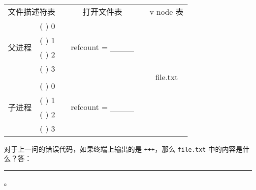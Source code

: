 \begin{problems}
\begin{table}[H]
            \tt
            \centering
            \begin{tabular}{cccccc}
                \multicolumn{2}{c}{文件描述符表} & {\qquad} & 打开文件表 & {\qquad} & v-node 表 \\ \cline{1-2} \cline{4-4} \cline{6-6} 
                \multicolumn{1}{|c|}{\multirow{4}{*}{父进程}} & \multicolumn{1}{c|}{(     ) 0} & \multicolumn{1}{c|}{} & \multicolumn{1}{c|}{\multirow{4}{*}{refcount = \_\_\_\_}} & \multicolumn{1}{c|}{} & \multicolumn{1}{c|}{\multirow{9}{*}{file.txt}} \\ \cline{2-2}
                \multicolumn{1}{|c|}{} & \multicolumn{1}{c|}{(     ) 1} & \multicolumn{1}{c|}{} & \multicolumn{1}{c|}{} & \multicolumn{1}{c|}{} & \multicolumn{1}{c|}{} \\ \cline{2-2}
                \multicolumn{1}{|c|}{} & \multicolumn{1}{c|}{(     ) 2} & \multicolumn{1}{c|}{} & \multicolumn{1}{c|}{} & \multicolumn{1}{c|}{} & \multicolumn{1}{c|}{} \\ \cline{2-2}
                \multicolumn{1}{|c|}{} & \multicolumn{1}{c|}{(     ) 3} & \multicolumn{1}{c|}{} & \multicolumn{1}{c|}{} & \multicolumn{1}{c|}{} & \multicolumn{1}{c|}{} \\ \cline{1-2} \cline{4-4}
                &  &  &  & \multicolumn{1}{c|}{} & \multicolumn{1}{c|}{} \\ \cline{1-2} \cline{4-4}
                \multicolumn{1}{|c|}{\multirow{4}{*}{子进程}} & \multicolumn{1}{c|}{(     ) 0} & \multicolumn{1}{c|}{} & \multicolumn{1}{c|}{\multirow{4}{*}{refcount = \_\_\_\_}} & \multicolumn{1}{c|}{} & \multicolumn{1}{c|}{} \\ \cline{2-2}
                \multicolumn{1}{|c|}{} & \multicolumn{1}{c|}{(     ) 1} & \multicolumn{1}{c|}{} & \multicolumn{1}{c|}{} & \multicolumn{1}{c|}{} & \multicolumn{1}{c|}{} \\ \cline{2-2}
                \multicolumn{1}{|c|}{} & \multicolumn{1}{c|}{(     ) 2} & \multicolumn{1}{c|}{} & \multicolumn{1}{c|}{} & \multicolumn{1}{c|}{} & \multicolumn{1}{c|}{} \\ \cline{2-2}
                \multicolumn{1}{|c|}{} & \multicolumn{1}{c|}{(     ) 3} & \multicolumn{1}{c|}{} & \multicolumn{1}{c|}{} & \multicolumn{1}{c|}{} & \multicolumn{1}{c|}{} \\ \cline{1-2} \cline{4-4} \cline{6-6} 
            \end{tabular}
        \end{table}
        \qn 对于上一问的错误代码，如果终端上输出的是 \verb|+++|，那么 \verb|file.txt| 中的内容是什么？答：\rule{6cm}{0.25mm}。

\end{problems}
